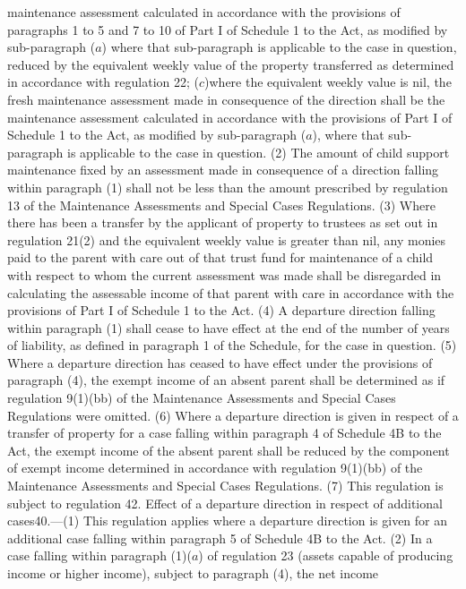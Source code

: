 \documentclass[a4paper]{article}
\begin{document}
maintenance assessment calculated in accordance with the provisions of
paragraphs 1 to 5 and 7 to 10 of Part I of Schedule 1 to the Act, as modified by
sub-paragraph ($a$) where that sub-paragraph is applicable to the case in
question, reduced by the equivalent weekly value of the property transferred as
determined in accordance with regulation 22;
($c$)where the equivalent weekly value is nil, the fresh maintenance assessment
made in consequence of the direction shall be the maintenance assessment
calculated in accordance with the provisions of Part I of Schedule 1 to the Act,
as modified by sub-paragraph ($a$), where that sub-paragraph is applicable to the
case in question.
(2) The amount of child support maintenance fixed by an assessment made in
consequence of a direction falling within paragraph (1) shall not be less than
the amount prescribed by regulation 13 of the Maintenance Assessments and
Special Cases Regulations.
(3) Where there has been a transfer by the applicant of property to trustees as
set out in regulation 21(2) and the equivalent weekly value is greater than nil,
any monies paid to the parent with care out of that trust fund for maintenance
of a child with respect to whom the current assessment was made shall be
disregarded in calculating the assessable income of that parent with care in
accordance with the provisions of Part I of Schedule 1 to the Act.
(4) A departure direction falling within paragraph (1) shall cease to have
effect at the end of the number of years of liability, as defined in paragraph 1
of the Schedule, for the case in question.
(5) Where a departure direction has ceased to have effect under the provisions
of paragraph (4), the exempt income of an absent parent shall be determined as
if regulation 9(1)(bb) of the Maintenance Assessments and Special Cases
Regulations were omitted.
(6) Where a departure direction is given in respect of a transfer of property
for a case falling within paragraph 4 of Schedule 4B to the Act, the exempt
income of the absent parent shall be reduced by the component of exempt income
determined in accordance with regulation 9(1)(bb) of the Maintenance Assessments
and Special Cases Regulations.
(7) This regulation is subject to regulation 42.
Effect of a departure direction in respect of additional cases40.—(1) This
regulation applies where a departure direction is given for an additional case
falling within paragraph 5 of Schedule 4B to the Act.
(2) In a case falling within paragraph (1)($a$) of regulation 23 (assets capable
of producing income or higher income), subject to paragraph (4), the net income
\end{document}
